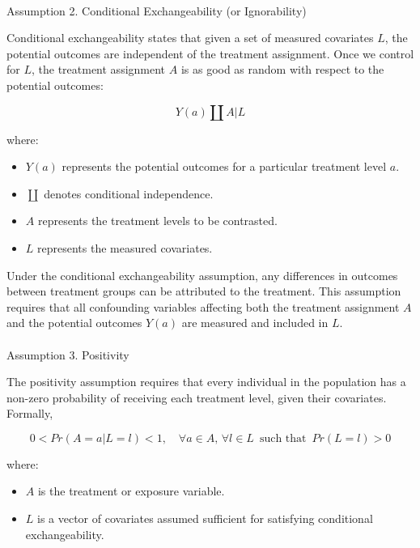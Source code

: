 \documentclass[
  single column]{article}
\makeatletter
\let\oldparagraph\paragraph
\renewcommand{\paragraph}{
    \@ifstar
      \xxxParagraphStar
      \xxxParagraphNoStar
  }
\newcommand{\xxxParagraphStar}[1]{\oldparagraph*{#1}\mbox{}}
\newcommand{\xxxParagraphNoStar}[1]{\oldparagraph{#1}\mbox{}}
\providecommand{\tightlist}{%
  \setlength{\itemsep}{0pt}\setlength{\parskip}{0pt}}\usepackage{longtable,booktabs,array}
\makeatother
\begin{document}
\paragraph{Assumption 2. Conditional Exchangeability (or
Ignorability)}\label{assumption-2.-conditional-exchangeability-or-ignorability}

Conditional exchangeability states that given a set of measured
covariates \(L\), the potential outcomes are independent of the
treatment assignment. Once we control for \(L\), the treatment
assignment \(A\) is as good as random with respect to the potential
outcomes:

\[
Y(a) \coprod A | L
\]

where:

\begin{itemize}
\tightlist
\item
  \(Y(a)\) represents the potential outcomes for a particular treatment
  level \(a\).
\item
  \(\coprod\) denotes conditional independence.
\item
  \(A\) represents the treatment levels to be contrasted.
\item
  \(L\) represents the measured covariates.
\end{itemize}

Under the conditional exchangeability assumption, any differences in
outcomes between treatment groups can be attributed to the treatment.
This assumption requires that all confounding variables affecting both
the treatment assignment \(A\) and the potential outcomes \(Y(a)\) are
measured and included in \(L\).

\paragraph{Assumption 3. Positivity}\label{assumption-3.-positivity}

The positivity assumption requires that every individual in the
population has a non-zero probability of receiving each treatment level,
given their covariates. Formally,

\[
0 < Pr(A = a | L = l) < 1, \quad \forall a \in A, \, \forall l \in L \, \text{ such that } \, Pr(L = l) > 0
\]

where:

\begin{itemize}
\tightlist
\item
  \(A\) is the treatment or exposure variable.
\item
  \(L\) is a vector of covariates assumed sufficient for satisfying
  conditional exchangeability.
\end{itemize}
\end{document}
